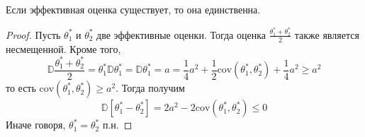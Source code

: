 \begin{advice}
Если эффективная оценка существует, то она единственна.
\end{advice}
\begin{proof}
Пусть $\theta^*_1$ и $\theta^*_2$ две эффективные оценки. Тогда оценка $\frac{\theta^*_1 + \theta^*_2}{2}$ также является несмещенной. Кроме того,
\[
    \mathbb{D}\frac{\theta^*_1 + \theta^*_2}{2} =\theta^*_1\mathbb{D} \theta^*_1 = \mathbb{D} \theta^*_1 = a = \frac 1 4 a ^ 2 + \frac 1 2 \text{cov}\left(\theta^*_1, \theta^*_2\right) + \frac 1 4 a ^ 2 \geq a ^ 2
\]
то есть $\text{cov}\left(\theta^*_1, \theta^*_2\right) \geq a ^ 2$. Тогда получим
\[
    \mathbb{D}\left[\theta^*_1 - \theta^*_2\right] = 2 a ^ 2 - 2 \text{cov}\left(\theta^*_1, \theta^*_2\right) \leq 0
\]
Иначе говоря, $\theta^*_1 = \theta^*_2$ п.н.
\end{proof}
